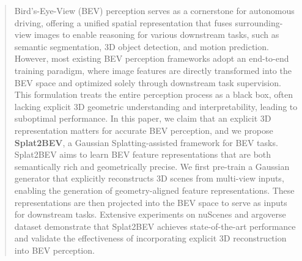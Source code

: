 \begin{abstract}
Bird’s-Eye-View (BEV) perception serves as a cornerstone for autonomous driving, offering a unified spatial representation that fuses surrounding-view images to enable reasoning for various downstream tasks, such as semantic segmentation, 3D object detection, and motion prediction.
However, most existing BEV perception frameworks adopt an end-to-end training paradigm, where image features are directly transformed into the BEV space and optimized solely through downstream task supervision. 
This formulation treats the entire perception process as a black box, often lacking explicit 3D geometric understanding and interpretability, leading to suboptimal performance.
In this paper, we claim that an explicit 3D representation matters for accurate BEV perception, and we propose \textbf{Splat2BEV}, a Gaussian Splatting-assisted framework for BEV tasks. 
Splat2BEV aims to learn BEV feature representations that are both semantically rich and geometrically precise. 
We first pre-train a Gaussian generator that explicitly reconstructs 3D scenes from multi-view inputs, enabling the generation of geometry-aligned feature representations.
These representations are then projected into the BEV space to serve as inputs for downstream tasks.
Extensive experiments on nuScenes and argoverse dataset demonstrate that Splat2BEV achieves state-of-the-art performance and validate the effectiveness of incorporating explicit 3D reconstruction into BEV perception.
\end{abstract}